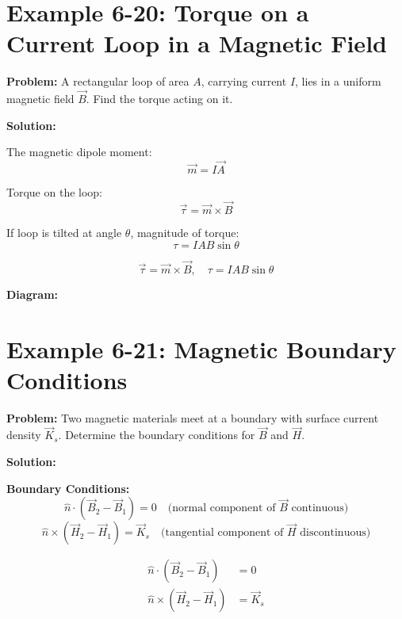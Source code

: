 \documentclass[12pt]{article}
\begin{document}
\section*{Example 6-20: Torque on a Current Loop in a Magnetic Field}

\textbf{Problem:}  
A rectangular loop of area \( A \), carrying current \( I \), lies in a uniform magnetic field \( \vec{B} \). Find the torque acting on it.

\textbf{Solution:}

The magnetic dipole moment:
\[
\vec{m} = I \vec{A}
\]

Torque on the loop:
\[
\vec{\tau} = \vec{m} \times \vec{B}
\]

If loop is tilted at angle \( \theta \), magnitude of torque:
\[
\tau = I A B \sin\theta
\]

\begin{tcolorbox}
\[
\boxed{\vec{\tau} = \vec{m} \times \vec{B}}, \quad
\boxed{\tau = I A B \sin\theta}
\]
\end{tcolorbox}

\textbf{Diagram:}
\begin{center}
\end{center}



\section*{Example 6-21: Magnetic Boundary Conditions}

\textbf{Problem:}  
Two magnetic materials meet at a boundary with surface current density \( \vec{K}_s \). Determine the boundary conditions for \( \vec{B} \) and \( \vec{H} \).

\textbf{Solution:}

\textbf{Boundary Conditions:}
\[
\hat{n} \cdot (\vec{B}_2 - \vec{B}_1) = 0
\quad \text{(normal component of } \vec{B} \text{ continuous)}
\]
\[
\hat{n} \times (\vec{H}_2 - \vec{H}_1) = \vec{K}_s
\quad \text{(tangential component of } \vec{H} \text{ discontinuous)}
\]

\begin{tcolorbox}
\[
\boxed{
\begin{aligned}
\hat{n} \cdot (\vec{B}_2 - \vec{B}_1) &= 0 \\
\hat{n} \times (\vec{H}_2 - \vec{H}_1) &= \vec{K}_s
\end{aligned}
}
\]
\end{tcolorbox}
\end{document}

